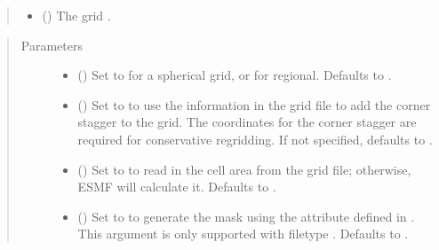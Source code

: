 \documentclass[letterpaper,10pt,english]{sphinxmanual}
\begin{document}
\begin{fulllineitems}
\begin{quote}
\begin{description}
\begin{itemize}
\item {} 
 ({\hyperref[\detokenize{FileFormat:ESMF.api.constants.FileFormat}]{}}) \textendash{} The grid {\hyperref[\detokenize{FileFormat:ESMF.api.constants.FileFormat}]{}}.

\end{itemize}

\end{description}\end{quote}

\begin{quote}\begin{description}
\item[{Parameters}] \leavevmode\begin{itemize}
\item {} 
 () \textendash{} Set to  for a spherical grid, or 
for regional. Defaults to .

\item {} 
 () \textendash{} Set to  to use the information in
the grid file to add the corner stagger to the grid. The coordinates for
the corner stagger are required for conservative regridding. If
not specified, defaults to .

\item {} 
 () \textendash{} Set to  to read in the cell area from the
grid file; otherwise, ESMF will calculate it. Defaults to .

\item {} 
 () \textendash{} Set to  to generate the mask using the
 attribute defined in .  This argument is
only supported with filetype
{\hyperref[\detokenize{FileFormat:ESMF.api.constants.FileFormat.GRIDSPEC}]{}}.
Defaults to .


\end{itemize}
\end{description}
\end{quote}
\end{fulllineitems}
\end{document}
